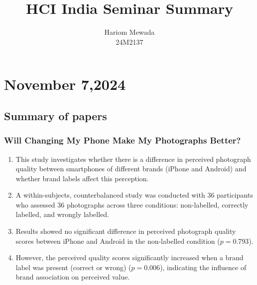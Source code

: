 \documentclass[12pt]{article}
\begin{document}
\title{HCI India Seminar Summary}
\author{Hariom Mewada\\
24M2137}
\maketitle

\newpage
\tableofcontents
\newpage

\section{November 7,2024}

\subsection{Summary of papers}
\subsubsection{Will Changing My Phone Make My
Photographs Better?}
\begin{enumerate}
    \item This study investigates whether there is a difference in perceived photograph quality between smartphones of different brands (iPhone and Android) and whether brand labels affect this perception.
    \item A within-subjects, counterbalanced study was conducted with 36 participants who assessed 36 photographs across three conditions: non-labelled, correctly labelled, and wrongly labelled.
    \item Results showed no significant difference in perceived photograph quality scores between iPhone and Android in the non-labelled condition ($p = 0.793$).
    \item However, the perceived quality scores significantly increased when a brand label was present (correct or wrong) ($p = 0.006$), indicating the influence of brand association on perceived value.
\end{enumerate}
\end{document}
